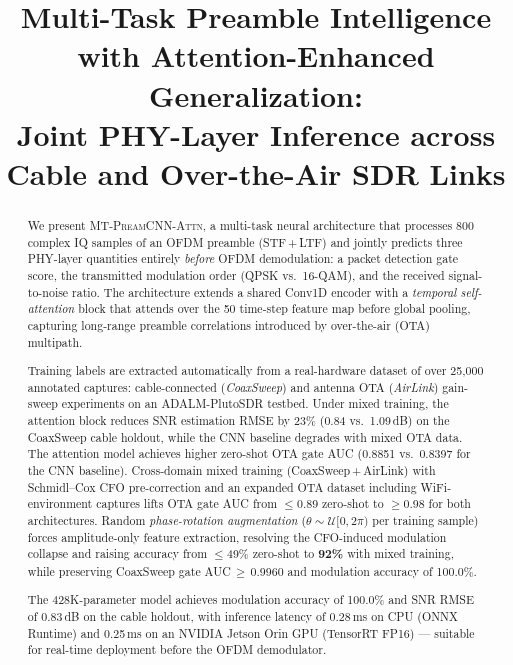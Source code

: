 \documentclass[conference]{IEEEtran}
\newcommand{\mtcnnattn}{\textsc{MT-PreamCNN-Attn}}
\begin{document}
\title{Multi-Task Preamble Intelligence with Attention-Enhanced Generalization:\\
       Joint PHY-Layer Inference across Cable and Over-the-Air SDR Links}

\author{
}

\maketitle

\begin{abstract}
We present \mtcnnattn{}, a multi-task neural architecture that processes
800 complex IQ samples of an OFDM preamble (STF\,+\,LTF) and jointly
predicts three PHY-layer quantities entirely \emph{before} OFDM
demodulation: a packet detection gate score, the transmitted modulation
order (QPSK vs.\ 16-QAM), and the received signal-to-noise ratio.
The architecture extends a shared Conv1D encoder with a
\emph{temporal self-attention} block that attends over the 50 time-step
feature map before global pooling, capturing long-range preamble
correlations introduced by over-the-air (OTA) multipath.

Training labels are extracted automatically from a real-hardware
dataset of over 25{,}000 annotated captures: cable-connected
(\emph{CoaxSweep}) and antenna OTA (\emph{AirLink}) gain-sweep
experiments on an ADALM-PlutoSDR testbed.
Under mixed training, the attention block reduces SNR estimation RMSE
by 23\% (0.84 vs.\ 1.09\,dB) on the CoaxSweep cable holdout,
while the CNN baseline degrades with mixed OTA data.
The attention model achieves higher zero-shot OTA gate AUC
(0.8851 vs.\ 0.8397 for the CNN baseline).
Cross-domain mixed training (CoaxSweep\,+\,AirLink) with
Schmidl--Cox CFO pre-correction and an expanded OTA dataset
including WiFi-environment captures lifts OTA gate AUC from
$\le$0.89 zero-shot to $\ge$0.98 for both architectures.
Random \emph{phase-rotation augmentation} ($\theta \sim \mathcal{U}[0,2\pi)$
per training sample) forces amplitude-only feature extraction,
resolving the CFO-induced modulation collapse and raising accuracy
from $\le$49\% zero-shot to \textbf{92\%} with mixed training,
while preserving CoaxSweep gate AUC\,$\ge$\,0.9960 and
modulation accuracy of 100.0\%.

The 428K-parameter model achieves modulation accuracy of 100.0\%
and SNR RMSE of 0.83\,dB on the cable holdout,
with inference latency of 0.28\,ms on CPU (ONNX Runtime) and
0.25\,ms on an NVIDIA Jetson Orin GPU (TensorRT FP16) — suitable
for real-time deployment before the OFDM demodulator.
\end{abstract}
\end{document}
